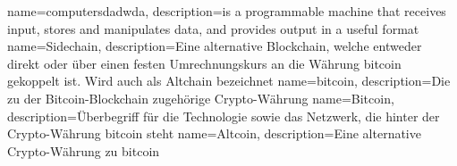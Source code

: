 {
	name=computersdadwda,
	description={is a programmable machine that receives input,
		stores and manipulates data, and provides
		output in a useful format}
}
{
	name=Sidechain,
	description={Eine alternative Blockchain, welche entweder direkt oder über einen festen Umrechnungskurs an die Währung bitcoin gekoppelt ist. Wird auch als Altchain bezeichnet}	
}
{
	name=bitcoin,
	description={Die zu der Bitcoin-Blockchain zugehörige Crypto-Währung}	
}
{
	name=Bitcoin,
	description={Überbegriff für die Technologie sowie das Netzwerk, die hinter der Crypto-Währung bitcoin steht}	
}
{
	name=Altcoin,
	description={Eine alternative Crypto-Währung zu bitcoin}	
}
